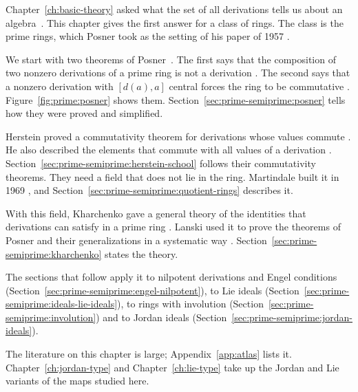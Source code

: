 
Chapter~\ref{ch:basic-theory} asked what the set of all derivations tells us
about an algebra~\cite[p.~1093]{Posner1957}. This chapter gives the first answer for a class of rings.
The class is the prime rings, which Posner took as the setting of his paper of
1957 \cite[p.~1093]{Posner1957}.

We start with two theorems of Posner~\cite[p.~1093]{Posner1957}. The first says that the composition
of two nonzero derivations of a prime ring is not a derivation
\cite[p.~1093]{Posner1957}. The second says that a nonzero derivation with
$[d(a),a]$ central forces the ring to be commutative
\cite[p.~1093]{Posner1957}. Figure~\ref{fig:prime:posner} shows them.
Section~\ref{sec:prime-semiprime:posner} tells how they were proved and
simplified.

Herstein proved a commutativity theorem for derivations whose values commute
\cite[Theorem~2, p.~1]{Herstein1978}. He also described the elements that
commute with all values of a derivation \cite[p.~509]{Herstein1979}.
Section~\ref{sec:prime-semiprime:herstein-school} follows their commutativity
theorems. They need a field that does not lie in the ring. Martindale built it
in 1969 \cite[p.~576]{Martindale1969}, and
Section~\ref{sec:prime-semiprime:quotient-rings} describes it.

With this field, Kharchenko gave a general theory of the identities that
derivations can satisfy in a prime ring \cite[p.~155]{Kharchenko1978}.
Lanski used it to prove the theorems of Posner and their generalizations in a
systematic way \cite[p.~276]{Lanski1988}.
Section~\ref{sec:prime-semiprime:kharchenko} states the theory.

The sections that follow apply it to nilpotent derivations and Engel
conditions (Section~\ref{sec:prime-semiprime:engel-nilpotent}), to Lie ideals
(Section~\ref{sec:prime-semiprime:ideals-lie-ideals}), to rings with
involution (Section~\ref{sec:prime-semiprime:involution}) and to Jordan ideals
(Section~\ref{sec:prime-semiprime:jordan-ideals}).

The literature on this chapter is large; Appendix~\ref{app:atlas} lists it.
Chapter~\ref{ch:jordan-type} and Chapter~\ref{ch:lie-type} take up the Jordan
and Lie variants of the maps studied here.


